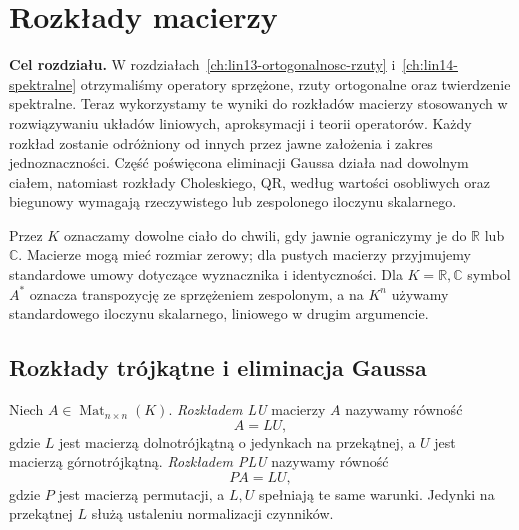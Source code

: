 \chapter{Rozkłady macierzy}
\label{ch:lin15-rozklady-macierzy}

\providecommand{\atlasref}[2]{#2}

\noindent\textbf{Cel rozdziału.}
W rozdziałach~\ref{ch:lin13-ortogonalnosc-rzuty}
i~\ref{ch:lin14-spektralne} otrzymaliśmy operatory
sprzężone, rzuty ortogonalne oraz twierdzenie
spektralne. Teraz wykorzystamy te wyniki do
rozkładów macierzy stosowanych w rozwiązywaniu
układów liniowych, aproksymacji i teorii operatorów.
Każdy rozkład zostanie odróżniony od innych
przez jawne założenia i zakres jednoznaczności.
Część poświęcona eliminacji Gaussa działa nad
dowolnym ciałem, natomiast rozkłady Choleskiego,
QR, według wartości osobliwych oraz biegunowy
wymagają rzeczywistego lub zespolonego
iloczynu skalarnego.

Przez \(K\) oznaczamy dowolne ciało do chwili,
gdy jawnie ograniczymy je do
\(\mathbb R\) lub \(\mathbb C\).
Macierze mogą mieć rozmiar zerowy; dla
pustych macierzy przyjmujemy standardowe
umowy dotyczące wyznacznika i identyczności.
Dla \(K=\mathbb R,\mathbb C\) symbol \(A^*\)
oznacza transpozycję ze sprzężeniem zespolonym, a na
\(K^n\) używamy standardowego iloczynu
skalarnego, liniowego w drugim argumencie.

\section{Rozkłady trójkątne i eliminacja Gaussa}
\label{sec:lin15-lu}

\begin{definicja}
\label{def:lin15-lu}
Niech \(A\in\operatorname{Mat}_{n\times n}(K)\).
\emph{Rozkładem LU} macierzy \(A\) nazywamy
równość
\[
 A=LU,
\]
gdzie \(L\) jest macierzą dolnotrójkątną
o jedynkach na przekątnej, a \(U\) jest
macierzą górnotrójkątną.
\emph{Rozkładem PLU} nazywamy równość
\[
 PA=LU,
\]
gdzie \(P\) jest macierzą permutacji,
a \(L,U\) spełniają te same warunki.
Jedynki na przekątnej \(L\) służą
ustaleniu normalizacji czynników.
\end{definicja}

